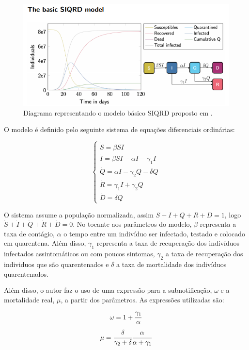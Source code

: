 \documentclass[12pt]{article}
\begin{document}
\begin{figure}[h]
\begin{center}
    \includegraphics[scale = 0.6]{diag-meso.png}
    \caption{Diagrama representando o modelo básico SIQRD proposto em \cite{kergassner2020meso}.}
\end{center}
\end{figure}

\noindent O modelo é definido pelo seguinte sistema de equações diferenciais ordinárias:

\begin{center}
$$
\begin{cases}
\dot S = \beta S I \\
\dot I = \beta S I - \alpha I - \gamma_1 I\\
\dot Q = \alpha I - \gamma_2 Q - \delta Q\\
\dot R = \gamma_1 I + \gamma_2 Q \\
\dot D = \delta Q
\end{cases}
$$
\end{center}

O sistema assume a população normalizada, assim $S + I + Q +R + D = 1$, logo $\dot S + \dot I + \dot Q +\dot R + \dot D = 0$. No tocante aos parâmetros do modelo, $\beta$ representa a taxa de contágio, $\alpha$ o tempo entre um indivíduo ser infectado, testado e colocado em quarentena. Além disso, $\gamma_1$ representa a taxa de recuperação dos indivíduos infectados assintomáticos ou com poucos sintomas, $\gamma_2$ a taxa de recuperação dos individuos que são quarentenados e $\delta$ a taxa de mortalidade dos indivíduos quarentenados.

Além disso, o autor faz o uso de uma expressão para a subnotificação, $\omega$ e a mortalidade real, $\mu$, a partir dos parâmetros. As expressões utilizadas são:
$$\omega = 1 + \cfrac{\gamma_1}{\alpha}$$
$$\mu = \cfrac{\delta}{\gamma_2 + \delta} \cfrac{\alpha}{\alpha + \gamma_1}$$
\end{document}
